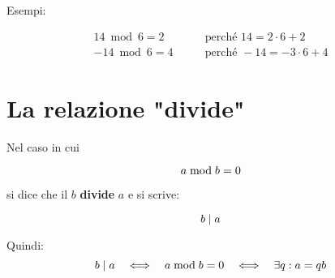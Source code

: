 Esempi:

\begin{align*}
    14 \bmod 6 = 2 &\quad\quad\text{perché } 14 = 2\cdot 6 + 2 \\
    -14 \bmod 6 = 4 &\quad\quad\text{perché } -14 = -3 \cdot 6 + 4
\end{align*}

\section{La relazione "divide"}

\begin{definizione}
    Nel caso in cui

    \begin{equation*}
        a  \bmod  b = 0
    \end{equation*}
    
    si dice che il $b$ \textbf{divide} $a$ e si scrive:

    \begin{equation}
        b  \mid  a
    \end{equation}

    Quindi:
    \begin{equation*}
        b  \mid  a  \quad\Longleftrightarrow\quad  a  \bmod  b = 0  \quad\Longleftrightarrow\quad  \exists q : a = qb
    \end{equation*}
    
\end{definizione}

